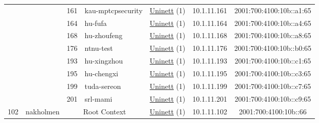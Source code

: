 \begin{small}
\begin{center}
\begin{longtable}{|c|c|c|c|c|c|c|c|}
  &  & \tiny{161} & \multicolumn{1}{|l|}{\tiny{kau-mptcpsecurity}} & \multicolumn{2}{|c|}{\tiny{\href{https://www.uninett.no}{Uninett} (1)}} & \tiny{10.1.11.161} & \tiny{2001:700:4100:10b::a1:65} \\* \cline{3-3}\cline{4-4}\cline{5-5}\cline{6-6}\cline{7-7}\cline{8-8}
  &  & \tiny{164} & \multicolumn{1}{|l|}{\tiny{hu-fufa}} & \multicolumn{2}{|c|}{\tiny{\href{https://www.uninett.no}{Uninett} (1)}} & \tiny{10.1.11.164} & \tiny{2001:700:4100:10b::a4:65} \\* \cline{3-3}\cline{4-4}\cline{5-5}\cline{6-6}\cline{7-7}\cline{8-8}
  &  & \tiny{168} & \multicolumn{1}{|l|}{\tiny{hu-zhoufeng}} & \multicolumn{2}{|c|}{\tiny{\href{https://www.uninett.no}{Uninett} (1)}} & \tiny{10.1.11.168} & \tiny{2001:700:4100:10b::a8:65} \\* \cline{3-3}\cline{4-4}\cline{5-5}\cline{6-6}\cline{7-7}\cline{8-8}
  &  & \tiny{176} & \multicolumn{1}{|l|}{\tiny{ntnu-test}} & \multicolumn{2}{|c|}{\tiny{\href{https://www.uninett.no}{Uninett} (1)}} & \tiny{10.1.11.176} & \tiny{2001:700:4100:10b::b0:65} \\* \cline{3-3}\cline{4-4}\cline{5-5}\cline{6-6}\cline{7-7}\cline{8-8}
  &  & \tiny{193} & \multicolumn{1}{|l|}{\tiny{hu-xingzhou}} & \multicolumn{2}{|c|}{\tiny{\href{https://www.uninett.no}{Uninett} (1)}} & \tiny{10.1.11.193} & \tiny{2001:700:4100:10b::c1:65} \\* \cline{3-3}\cline{4-4}\cline{5-5}\cline{6-6}\cline{7-7}\cline{8-8}
  &  & \tiny{195} & \multicolumn{1}{|l|}{\tiny{hu-chengxi}} & \multicolumn{2}{|c|}{\tiny{\href{https://www.uninett.no}{Uninett} (1)}} & \tiny{10.1.11.195} & \tiny{2001:700:4100:10b::c3:65} \\* \cline{3-3}\cline{4-4}\cline{5-5}\cline{6-6}\cline{7-7}\cline{8-8}
  &  & \tiny{199} & \multicolumn{1}{|l|}{\tiny{tuda-sereon}} & \multicolumn{2}{|c|}{\tiny{\href{https://www.uninett.no}{Uninett} (1)}} & \tiny{10.1.11.199} & \tiny{2001:700:4100:10b::c7:65} \\* \cline{3-3}\cline{4-4}\cline{5-5}\cline{6-6}\cline{7-7}\cline{8-8}
  &  & \tiny{201} & \multicolumn{1}{|l|}{\tiny{srl-mami}} & \multicolumn{2}{|c|}{\tiny{\href{https://www.uninett.no}{Uninett} (1)}} & \tiny{10.1.11.201} & \tiny{2001:700:4100:10b::c9:65} \\ \hline
 \multirow{14}{*}{\tiny{102}} & \multicolumn{1}{|l|}{\multirow{14}{*}{\tiny{nakholmen}}} & \multicolumn{2}{|c|}{\tiny{Root Context}} & \multicolumn{2}{|c|}{\tiny{\href{https://www.uninett.no}{Uninett} (1)}} & \tiny{10.1.11.102} & \tiny{2001:700:4100:10b::66} \\* \cline{3-3}\cline{4-4}\cline{5-5}\cline{6-6}\cline{7-7}\cline{8-8}

\end{longtable}
\end{center}
\end{small}
